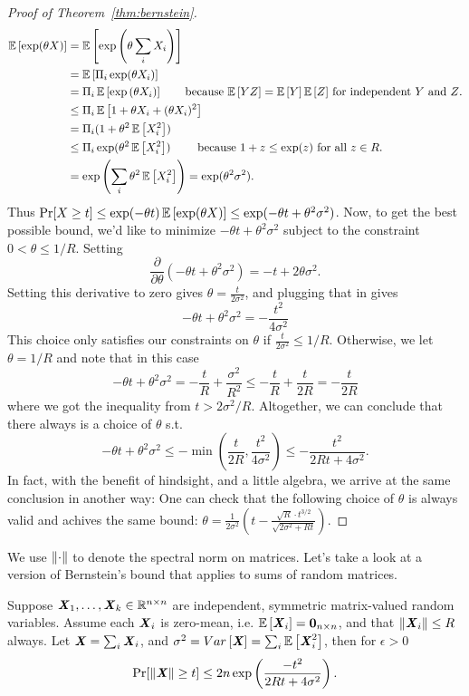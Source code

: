 \begin{proof}[Proof of Theorem~\ref{thm:bernstein}]
\begin{align*}
  \E{\exp(\theta X)}
  &= \E{\exp\left(\theta \sum_i X_i\right)}
  \\
  &=\E{\Pi_{i} \exp(\theta X_i)}
  \\
  &=\Pi_{i} \E{\exp{(\theta X_i)}}
    \tag*{because $\E{YZ} = \E{Y}\E{Z}$ for independent $Y$ and
    $Z$.} %
  \\
  &\leq\Pi_{i} \E{1+\theta X_i+(\theta X_i)^2}
  \\
  &=\Pi_{i} (1+\theta^2\E{ X_i^2})
  \\
  &\leq\Pi_{i} \exp( \theta^2\E{ X_i^2} )
    \tag*{ because $1+z \leq \exp(z)$ for all $z \in R$.}
  \\
  &=\exp\left( \sum_i \theta^2\E{ X_i^2} \right) = \exp(\theta^2 \sigma^2)
    .
\end{align*}
Thus
$\Pr[ X \geq t ] \leq \exp(-\theta t)\mathop{{}\mathbb{E}}\left[\exp(\theta X)\right] \leq
\exp(-\theta t + \theta^2 \sigma^2)$.
Now, to get the best possible bound, we'd like to minimize
$-\theta t + \theta^2 \sigma^2$ subject to the constraint
$0< \theta \leq 1/R$.
Setting
\[ \frac{\partial}{\partial \theta}\left(
    -\theta t + \theta^2
    \sigma^2
  \right)
  = - t + 2 \theta \sigma^2
  .
\]
Setting this derivative to zero gives
$\theta = \frac{t}{2\sigma^2}$,
and plugging that in gives
\[
    -\theta t + \theta^2\sigma^2
    =
    -\frac{t^2}{4\sigma^2}
  \]
This choice only satisfies our constraints on $\theta$ if
$\frac{t}{2\sigma^2} \leq 1/R$.
Otherwise, we let $\theta =  1/R$ and note that in this case
\[
    -\theta t + \theta^2\sigma^2
    =
    -\frac{t}{R} + \frac{\sigma^2}{R^2}
    \leq
    -\frac{t}{R} + \frac{t}{2R}
    =
    -\frac{t}{2R}
  \]
  where we got the inequality from $t > 2\sigma^2/R$.
  Altogether, we can conclude that there always is a choice of
  $\theta$ s.t.
  \[
    -\theta t + \theta^2\sigma^2
    \leq
    - \min\left( \frac{t}{2R} , \frac{t^2}{4\sigma^2} \right)
    \leq
    - \frac{t^2}{2Rt + 4\sigma^2}
    .
  \]
  In fact, with the benefit of hindsight, and a little algebra, we
  arrive at the same conclusion in another way:
  One
  can check that the
  following choice of $\theta$ is always valid and achives the same
  bound:
  $\theta = \frac{1}{2
    \sigma^2}\left( t - \frac{\sqrt{R} \cdot t^{3/2}}{\sqrt{2\sigma^2 + R
        t}} \right)$.
\end{proof}
We use $\left\| \cdot \right\|$ to denote the spectral norm on matrices.
Let's take a look at a version of Bernstein's bound that applies to
sums of random matrices.
\begin{theorem}
  \label{thm:matbernstein}
  Suppose $\boldsymbol{\mathit{X}}_1, \ldots, \boldsymbol{\mathit{X}}_k \in \mathbb{R}^{n \times n}$ are independent,
  symmetric matrix-valued
  random variables.
Assume each $\boldsymbol{\mathit{X}}_i$ is zero-mean, i.e. $\mathop{{}\mathbb{E}}\left[\boldsymbol{\mathit{X}}_i\right] = \boldsymbol{0}_{n \times
  n}$, and that $\left\| \boldsymbol{\mathit{X}}_i \right\| \leq R$ always.
Let $\boldsymbol{\mathit{X}} = \sum_i \boldsymbol{\mathit{X}}_i$, and $\sigma^2 = \mathop{{}Var}\left[\boldsymbol{\mathit{X}}\right] = \sum_i \mathop{{}\mathbb{E}}\left[\boldsymbol{\mathit{X}}_i^2\right]$,
then for $\epsilon > 0$
\[
\Pr[ \left\| \boldsymbol{\mathit{X}} \right\| \geq t] \leq 2n\exp\left(\frac{-t^2}{2Rt + 4\sigma^2}\right)
.
\]
\end{theorem}
